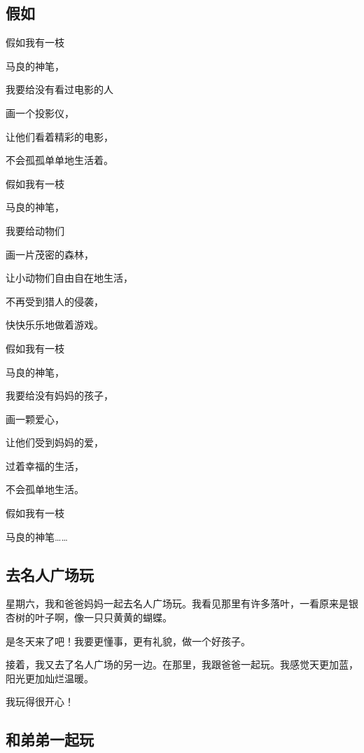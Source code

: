 \documentclass[UTF8,a4paper,titlepage,twoside,10.5pt]{article}
\begin{document}
\subsection{假如}
\label{sec:org8d7fe72}

假如我有一枝

马良的神笔，

我要给没有看过电影的人

画一个投影仪，

让他们看着精彩的电影，

不会孤孤单单地生活着。

\vspace*{\baselineskip}

假如我有一枝

马良的神笔，

我要给动物们

画一片茂密的森林，

让小动物们自由自在地生活，

不再受到猎人的侵袭，

快快乐乐地做着游戏。

\vspace*{\baselineskip}

假如我有一枝

马良的神笔，

我要给没有妈妈的孩子，

画一颗爱心，

让他们受到妈妈的爱，

过着幸福的生活，

不会孤单地生活。

\vspace*{\baselineskip}

假如我有一枝

马良的神笔……

\subsection{去名人广场玩}
\label{sec:org5bd7cbe}

星期六，我和爸爸妈妈一起去名人广场玩。我看见那里有许多落叶，一看原来是银杏树的叶子啊，像一只只黄黄的蝴蝶。

是冬天来了吧！我要更懂事，更有礼貌，做一个好孩子。

接着，我又去了名人广场的另一边。在那里，我跟爸爸一起玩。我感觉天更加蓝，阳光更加灿烂温暖。

我玩得很开心！

\subsection{和弟弟一起玩}
\label{sec:orgfab3892}
\end{document}
